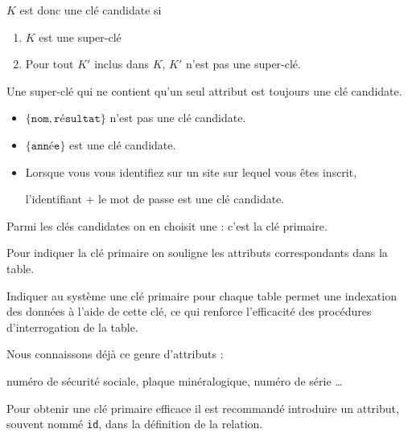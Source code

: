 $K$ est donc une clé candidate si
\begin{enumerate}
\item $K$ est une super-clé
\item Pour tout $K'$ inclus dans $K$, $K'$ n'est pas une super-clé.
\end{enumerate}
Une super-clé qui ne contient qu'un seul attribut est toujours une clé candidate.
\begin{itemize}
\item $\{\texttt{nom},\texttt{résultat}\}$ n'est pas une clé candidate. 
\item $\{\texttt{année}\}$ est une clé candidate. 
\item Lorsque vous vous identifiez sur un site sur lequel vous êtes inscrit, 

l'identifiant + le mot de passe est une clé candidate.
\end{itemize}
\begin{defin}

Parmi les clés candidates on en choisit une : c'est la clé primaire.
\end{defin}
Pour indiquer la clé primaire on souligne les attributs correspondants dans la table.

Indiquer au système une clé primaire pour chaque table permet une indexation des données à l'aide
de cette clé, ce qui renforce l'efficacité des procédures d'interrogation de la table.

Nous connaissons déjà ce genre d'attributs : 

numéro de sécurité sociale, plaque minéralogique, numéro de série \dots

Pour obtenir une clé primaire efficace il est recommandé introduire un attribut, souvent nommé {\tt id}, dans la définition de la relation. 

